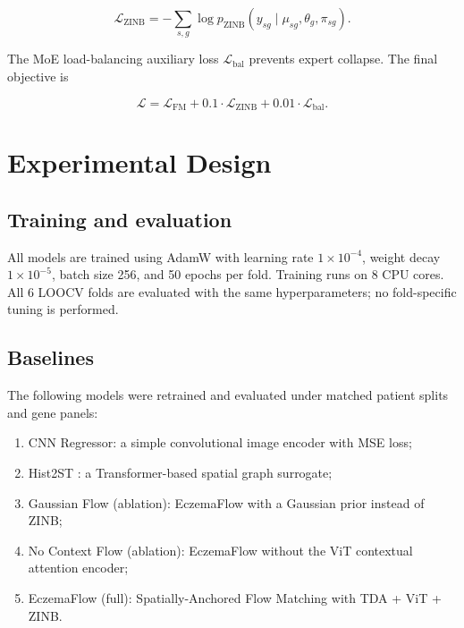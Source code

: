 \documentclass[nocrop]{bioinfo}
\begin{document}
\begin{equation}
\mathcal{L}_{\mathrm{ZINB}}=
-\sum_{s,g}
\log p_{\mathrm{ZINB}}
\left(y_{sg}\mid\mu_{sg},\theta_g,\pi_{sg}\right).
\end{equation}

The MoE load-balancing auxiliary loss $\mathcal{L}_{\mathrm{bal}}$ prevents expert collapse. The final objective is

\begin{equation}
\mathcal{L}=
\mathcal{L}_{\mathrm{FM}}
+ 0.1 \cdot \mathcal{L}_{\mathrm{ZINB}}
+ 0.01 \cdot \mathcal{L}_{\mathrm{bal}}.
\end{equation}

\section{Experimental Design}

\subsection{Training and evaluation}

All models are trained using AdamW \citep{loshchilov2019adamw} with learning rate $1 \times 10^{-4}$, weight decay $1 \times 10^{-5}$, batch size 256, and 50 epochs per fold. Training runs on 8 CPU cores. All 6 LOOCV folds are evaluated with the same hyperparameters; no fold-specific tuning is performed.

\subsection{Baselines}

The following models were retrained and evaluated under matched patient splits and gene panels:

\begin{enumerate}
\item CNN Regressor: a simple convolutional image encoder with MSE loss;
\item Hist2ST \citep{zeng2022hist2st}: a Transformer-based spatial graph surrogate;
\item Gaussian Flow (ablation): EczemaFlow with a Gaussian prior instead of ZINB;
\item No Context Flow (ablation): EczemaFlow without the ViT contextual attention encoder;
\item EczemaFlow (full): Spatially-Anchored Flow Matching with TDA + ViT + ZINB.
\end{enumerate}
\end{document}
